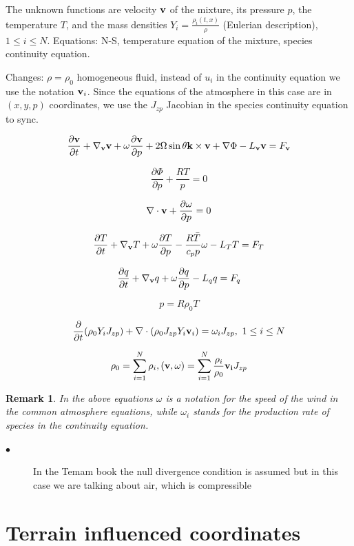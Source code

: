 \documentclass{article}
\newtheorem*{remark}{Remark}
\begin{document}
The unknown functions are velocity $\bold{v}$ of the mixture, its pressure $p$, the temperature $T$, and the mass densities $Y_i = \frac{\rho_i (t,x)}{\rho}$ (Eulerian description), $1 \leq i \leq N.$
Equations: N-S, temperature equation of the mixture, species continuity equation.

Changes: $\rho = \rho_0$ homogeneous fluid, instead of $u_i$ in the continuity equation we use the notation $\bold{v}_i$. Since the equations of the atmosphere in this case are in $(x,y,p)$ coordinates, we use the $J_{zp}$ Jacobian in the species continuity equation to sync.

\[ \frac{\partial \bold{v}}{\partial t} + \nabla_{\bold{v}}\bold{v} + \omega \frac{\partial \bold{v}}{\partial p} + 2 \Omega \sin \theta \bold{k} \times \bold{v} + \nabla \Phi -L_{\bold{v}} \bold{v} = F_\bold{v}  \]

\[ \frac{\partial \Phi}{\partial p} + \frac{RT}{p} = 0 \]

\[ \nabla \cdot \bold{v} + \frac{\partial \omega}{\partial p} = 0\]

\[ \frac{\partial T}{\partial t} + \nabla_{\bold{v}} T + \omega \frac{\partial T}{\partial p} - \frac{R \bar{T}}{c_p p} \omega - L_T T = F_T\]

\[ \frac{\partial q}{\partial t} + \nabla_{\bold{v}}q + \omega \frac{\partial q}{\partial p} -L_q q = F_q \]

\[ p = R \rho_0 T\]

\[ \frac{\partial}{\partial t} (\rho_0 Y_i J_{zp}) + \nabla \cdot (\rho_0 J_{zp} Y_i \bold{v}_i) = \omega_i J_{zp}, \text{  } 1 \leq i \leq N \]

\[ \rho_0 = \sum_{i =1}^{N} \rho_i, (\bold{v}, \omega) = \sum_{i =1}^{N}\frac{\rho_i}{\rho_0} \bold{v_i}J_{zp} \]

\begin{remark}
In the above equations $\omega$ is a notation for the speed of the wind in the common atmosphere equations, while $\omega_i$ stands for the production rate of species in the continuity equation.
\end{remark}

\begin{description}
  \item[$\bullet$] In the Temam book the null divergence condition is assumed but in this case we are talking about air, which is compressible
\end{description}

\section{Terrain influenced coordinates}
\end{document}
